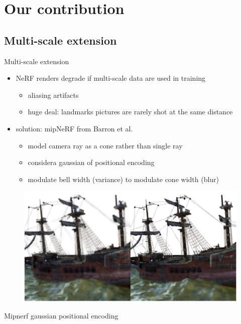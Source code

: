 \documentclass[aspectratio=1610]{beamer}
\begin{document}
\section{Our contribution}
\subsection{Multi-scale extension}
\begin{frame}{Multi-scale extension}
    \begin{itemize}
        \item NeRF renders degrade if multi-scale data are used in training 
        \begin{itemize}
            \item aliasing artifacts
            \item huge deal: landmarks pictures are rarely shot at the same distance
        \end{itemize}
        \item solution: mipNeRF from Barron et al.\cite{barron2021mipnerf}
        \begin{itemize}
            \item model camera ray as a cone rather than single ray
            \item considera gaussian of positional encoding
            \item modulate bell width (variance) to modulate cone width (blur)
        \end{itemize}
    \end{itemize}
    \bigskip
    \begin{figure}[H]
        \includegraphics[width=.4\textwidth]{mipnerf-results.png}
    \end{figure}
\end{frame}

\begin{frame}{Mipnerf gaussian positional encoding}
    \begin{center}
    \end{center}
\end{frame}
\end{document}
